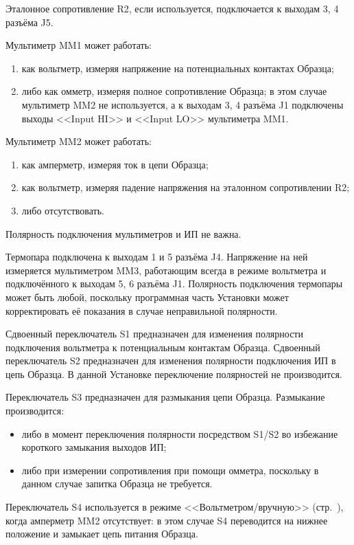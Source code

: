\documentclass[12pt, a4paper, twocolumn]{report}
\begin{document}
Эталонное сопротивление R2, если используется, подключается к выходам 3, 4 разъёма J5.

Мультиметр MM1 может работать:

\begin{enumerate}
\item как вольтметр, измеряя напряжение на потенциальных контактах Образца;
\item либо как омметр, измеряя полное сопротивление Образца; в этом случае мультиметр MM2 не используется, а к выходам 3, 4 разъёма J1 подключены выходы <<Input HI>> и <<Input LO>> мультиметра MM1.
\end{enumerate}

Мультиметр MM2 может работать:

\begin{enumerate}
\item как амперметр, измеряя ток в цепи Образца;
\item как вольтметр, измеряя падение напряжения на эталонном сопротивлении R2;
\item либо отсутствовать.
\end{enumerate}

Полярность подключения мультиметров и ИП не важна.

Термопара подключена к выходам 1 и 5 разъёма J4. Напряжение на ней измеряется мультиметром MM3, работающим всегда в режиме вольтметра и подключённого к выходам 5, 6 разъёма J1. Полярность подключения термопары может быть любой, поскольку программная часть Установки может корректировать её показания в случае неправильной полярности.

Сдвоенный переключатель S1 предназначен для изменения полярности подключения вольтметра к потенциальным контактам Образца. Сдвоенный переключатель S2 предназначен для изменения полярности подключения ИП в цепь Образца. В данной Установке переключение полярностей не производится.

Переключатель S3 предназначен для размыкания цепи Образца. Размыкание производится:

\begin{itemize}
\item либо в момент переключения полярности посредством S1/S2 во избежание короткого замыкания выходов ИП;
\item либо при измерении сопротивления при помощи омметра, поскольку в данном случае запитка Образца не требуется.
\end{itemize}

Переключатель S4 используется в режиме <<Вольтметром/вручную>> (стр.~\pageref{sec_voltmeter_manually}), когда амперметр MM2 отсутствует: в этом случае S4 переводится на нижнее положение и замыкает цепь питания Образца.
\end{document}
